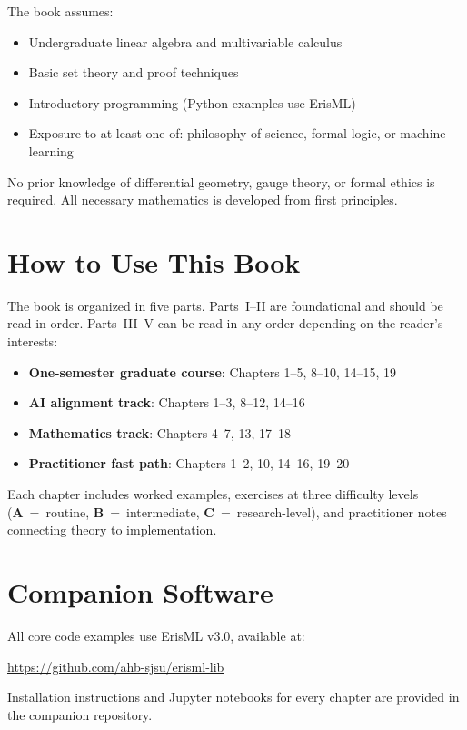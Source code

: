 \documentclass[12pt,letterpaper,twoside,openright]{book}
\theoremstyle{plain}
\theoremstyle{definition}
\theoremstyle{remark}
\newcounter{exercise}[chapter]
\begin{document}
The book assumes:
\begin{itemize}
    \item Undergraduate linear algebra and multivariable calculus
    \item Basic set theory and proof techniques
    \item Introductory programming (Python examples use ErisML)
    \item Exposure to at least one of: philosophy of science, formal logic, or machine learning
\end{itemize}

\noindent No prior knowledge of differential geometry, gauge theory, or formal ethics is required. All necessary mathematics is developed from first principles.

\section*{How to Use This Book}

The book is organized in five parts. Parts~I--II are foundational and should be read in order. Parts~III--V can be read in any order depending on the reader's interests:

\begin{itemize}
    \item \textbf{One-semester graduate course}: Chapters 1--5, 8--10, 14--15, 19
    \item \textbf{AI alignment track}: Chapters 1--3, 8--12, 14--16
    \item \textbf{Mathematics track}: Chapters 4--7, 13, 17--18
    \item \textbf{Practitioner fast path}: Chapters 1--2, 10, 14--16, 19--20
\end{itemize}

Each chapter includes worked examples, exercises at three difficulty levels (\textbf{A}~=~routine, \textbf{B}~=~intermediate, \textbf{C}~=~research-level), and practitioner notes connecting theory to implementation.

\section*{Companion Software}

All core code examples use ErisML v3.0, available at:
\begin{center}
\url{https://github.com/ahb-sjsu/erisml-lib}
\end{center}
Installation instructions and Jupyter notebooks for every chapter are provided in the companion repository.
\end{document}
